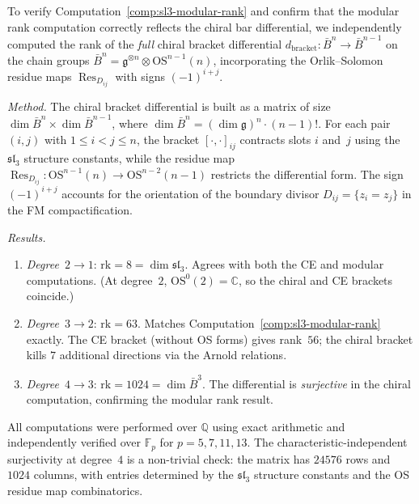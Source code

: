 \begin{computation}
\label{comp:sl3-chiral-bracket-os}

To verify Computation~\ref{comp:sl3-modular-rank} and confirm that the
modular rank computation correctly reflects the chiral bar differential,
we independently computed the rank of the \emph{full} chiral bracket
differential $d_{\mathrm{bracket}}\colon \bar{B}^n \to \bar{B}^{n-1}$
on the chain groups $\bar{B}^n = \mathfrak{g}^{\otimes n} \otimes
\mathrm{OS}^{n-1}(n)$, incorporating the Orlik--Solomon residue maps
$\operatorname{Res}_{D_{ij}}$ with signs $(-1)^{i+j}$.

\emph{Method.}
The chiral bracket differential is built as a matrix of size
$\dim \bar{B}^n \times \dim \bar{B}^{n-1}$, where
$\dim \bar{B}^n = (\dim \mathfrak{g})^n \cdot (n-1)!$.
For each pair $(i,j)$ with $1 \leq i < j \leq n$, the bracket
$[\cdot, \cdot]_{ij}$ contracts slots $i$ and~$j$ using the
$\mathfrak{sl}_3$ structure constants, while the residue map
$\operatorname{Res}_{D_{ij}}\colon \mathrm{OS}^{n-1}(n) \to
\mathrm{OS}^{n-2}(n-1)$ restricts the differential form.  The
sign $(-1)^{i+j}$ accounts for the orientation of the boundary
divisor $D_{ij} = \{z_i = z_j\}$ in the FM compactification.

\emph{Results.}
\begin{enumerate}[label=(\roman*)]
\item \emph{Degree~$2 \to 1$}: $\mathrm{rk} = 8 = \dim \mathfrak{sl}_3$.
  Agrees with both the CE and modular computations.
  (At degree~$2$, $\mathrm{OS}^0(2) = \mathbb{C}$, so the chiral
  and CE brackets coincide.)
\item \emph{Degree~$3 \to 2$}: $\mathrm{rk} = 63$.
  Matches Computation~\ref{comp:sl3-modular-rank} exactly.
  The CE bracket (without OS forms) gives rank~$56$; the chiral
  bracket kills $7$ additional directions via the Arnold relations.
\item \emph{Degree~$4 \to 3$}: $\mathrm{rk} = 1024 = \dim \bar{B}^3$.
  The differential is \emph{surjective} in the chiral computation,
  confirming the modular rank result.
\end{enumerate}

All computations were performed over $\mathbb{Q}$ using exact arithmetic
and independently verified over $\mathbb{F}_p$ for $p = 5, 7, 11, 13$.
The characteristic-independent surjectivity at degree~$4$ is a
non-trivial check: the matrix has $24576$ rows and $1024$ columns,
with entries determined by the $\mathfrak{sl}_3$ structure constants
and the OS residue map combinatorics.
\end{computation}


